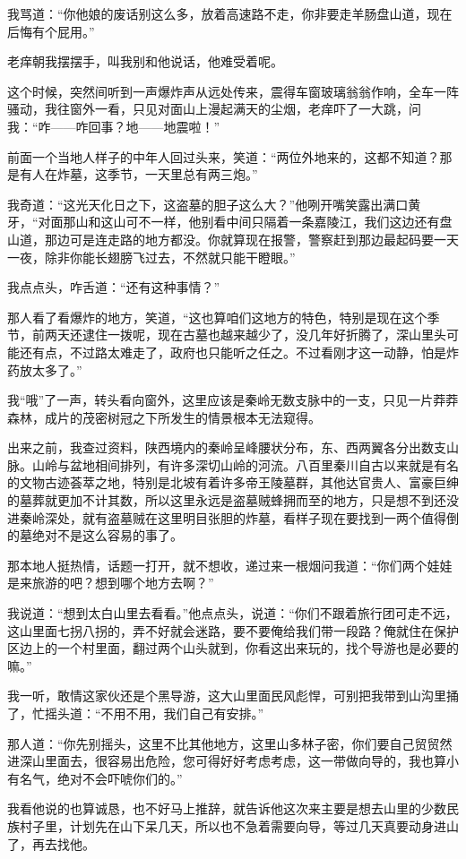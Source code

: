 我骂道：“你他娘的废话别这么多，放着高速路不走，你非要走羊肠盘山道，现在后悔有个屁用。”

老痒朝我摆摆手，叫我别和他说话，他难受着呢。

这个时候，突然间听到一声爆炸声从远处传来，震得车窗玻璃翁翁作响，全车一阵骚动，我往窗外一看，只见对面山上漫起满天的尘烟，老痒吓了一大跳，问我：“咋——咋回事？地——地震啦！”

前面一个当地人样子的中年人回过头来，笑道：“两位外地来的，这都不知道？那是有人在炸墓，这季节，一天里总有两三炮。”

我奇道：“这光天化日之下，这盗墓的胆子这么大？”他咧开嘴笑露出满口黄牙，“对面那山和这山可不一样，他别看中间只隔着一条嘉陵江，我们这边还有盘山道，那边可是连走路的地方都没。你就算现在报警，警察赶到那边最起码要一天一夜，除非你能长翅膀飞过去，不然就只能干瞪眼。”

我点点头，咋舌道：“还有这种事情？”

那人看了看爆炸的地方，笑道，“这也算咱们这地方的特色，特别是现在这个季节，前两天还逮住一拨呢，现在古墓也越来越少了，没几年好折腾了，深山里头可能还有点，不过路太难走了，政府也只能听之任之。不过看刚才这一动静，怕是炸药放太多了。”

我“哦”了一声，转头看向窗外，这里应该是秦岭无数支脉中的一支，只见一片莽莽森林，成片的茂密树冠之下所发生的情景根本无法窥得。

出来之前，我查过资料，陕西境内的秦岭呈峰腰状分布，东、西两翼各分出数支山脉。山岭与盆地相间排列，有许多深切山岭的河流。八百里秦川自古以来就是有名的文物古迹荟萃之地，特别是北坡有着许多帝王陵墓群，其他达官贵人、富豪巨绅的墓葬就更加不计其数，所以这里永远是盗墓贼蜂拥而至的地方，只是想不到还没进秦岭深处，就有盗墓贼在这里明目张胆的炸墓，看样子现在要找到一两个值得倒的墓绝对不是这么容易的事了。

那本地人挺热情，话题一打开，就不想收，递过来一根烟问我道：“你们两个娃娃是来旅游的吧？想到哪个地方去啊？”

我说道：“想到太白山里去看看。”他点点头，说道：“你们不跟着旅行团可走不远，这山里面七拐八拐的，弄不好就会迷路，要不要俺给我们带一段路？俺就住在保护区边上的一个村里面，翻过两个山头就到，你看这出来玩的，找个导游也是必要的嘛。”

我一听，敢情这家伙还是个黑导游，这大山里面民风彪悍，可别把我带到山沟里捅了，忙摇头道：“不用不用，我们自己有安排。”

那人道：“你先别摇头，这里不比其他地方，这里山多林子密，你们要自己贸贸然进深山里面去，很容易出危险，您可得好好考虑考虑，这一带做向导的，我也算小有名气，绝对不会吓唬你们的。”

我看他说的也算诚恳，也不好马上推辞，就告诉他这次来主要是想去山里的少数民族村子里，计划先在山下呆几天，所以也不急着需要向导，等过几天真要动身进山了，再去找他。

